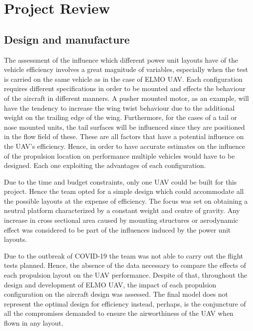 \documentclass[../../main.tex]{subfiles}
\begin{document}
\chapter{Project Review} \label{chapter:project-review}

\section{Design and manufacture} \label{sec:project-review:design-and-manufacture}

The assessment of the influence which different power unit layouts have of the vehicle efficiency involves a great magnitude of variables, especially when the test is carried on the same vehicle as in the case of ELMO UAV.
Each configuration requires different specifications in order to be mounted and effects the behaviour of the aircraft in different manners.
A pusher mounted motor, as an example, will have the tendency to increase the wing twist behaviour due to the additional weight on the trailing edge of the wing.
Furthermore, for the cases of a tail or nose mounted units, the tail surfaces will be influenced since they are positioned in the flow field of these.
These are all factors that have a potential influence on the UAV’s efficiency.
Hence, in order to have accurate estimates on the influence of the propulsion location on performance multiple vehicles would have to be designed.
Each one exploiting the advantages of each configuration. 

Due to the time and budget constraints, only one UAV could be built for this project.
Hence the team opted for a simple design which could accommodate all the possible layouts at the expense of efficiency.
The focus was set on obtaining a neutral platform characterized by a constant weight and centre of gravity.
Any increase in cross sectional area caused by mounting structures or aerodynamic effect was considered to be part of the influences induced by the power unit layouts. 

Due to the outbreak of COVID-19 the team was not able to carry out the flight tests planned.
Hence, the absence of the data necessary to compare the effects of each propulsion layout on the UAV performance.
Despite of that, throughout the design and development of ELMO UAV, the impact of each propulsion configuration on the aircraft design was assessed.
The final model does not represent the optimal design for efficiency instead, perhaps, is the conjuncture of all the compromises demanded to ensure the airworthiness of the UAV when flown in any layout. 
\end{document}
